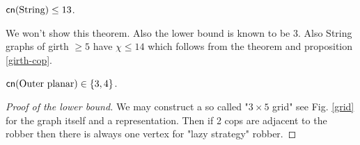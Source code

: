 \begin{thm}
	$\operatorname{\textsf{cn}}(\text{String}) \leq 13$.
\end{thm}

We won't show this theorem. Also the lower bound is known to be 3. Also String graphs of girth $\geq 5$ have $\chi \leq 14$ which follows from the theorem and proposition \ref{girth-cop}.

\begin{thm}
	$\operatorname{\textsf{cn}}(\text{Outer planar}) \in \{3,4\}$.
\end{thm}

\begin{proof}[Proof of the lower bound]
	We may construct a so called "$3 \times 5$ grid" see Fig. \ref{grid} for the graph itself and a representation. Then if 2 cops are adjacent to the robber then there is always one vertex for "lazy strategy" robber.
	

\end{proof}
